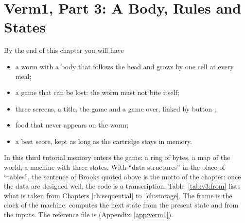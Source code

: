 \chapter{Verm1, Part 3: A Body, Rules and States}
\label{ch:verm1p3}


\begin{chapgoals}
By the end of this chapter you will have
\begin{itemize}
\item a worm with a body that follows the head and grows by one cell at every meal;
\item a game that can be lost: the worm must not bite itself;
\item three screens, a title, the game and a game over, linked by button ;
\item food that never appears on the worm;
\item a best score, kept as long as the cartridge stays in memory.
\end{itemize}
\end{chapgoals}


In this third tutorial memory enters the game: a ring of bytes, a map of the
world, a machine with three states. With ``data structures'' in the place of
``tables'', the sentence of Brooks quoted above is the motto of the chapter:
once the data are designed well, the code is a transcription.
Table~\ref{tab:v3:from} lists what is taken from Chapters \ref{ch:sequential}
to~\ref{ch:storage}. The frame is the clock of the machine: 
computes the next state from the present state and from the inputs. The
reference file is  (Appendix~\ref{app:verm1}).

